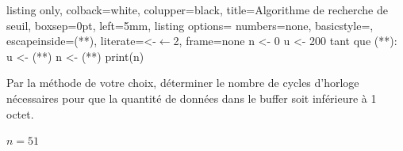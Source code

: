 \begin{enumerate}[series=monDS, resume]
\begin{minipage}{0.45\textwidth}
    \end{minipage}\hfill{}
    \begin{minipage}{0.46\textwidth}
    \begin{tcblisting}{%
  listing only,
  colback=white, 
  colupper=black, 
  title=Algorithme de recherche de seuil,
  boxsep=0pt,
  left=5mm,
  listing options={
    numbers=none,
    basicstyle=\ttfamily,
    escapeinside={(*}{*)},
    literate={<-}{{$\bm{\leftarrow}$}}2, %
    frame=none %
    }
}
n <- 0
u <- 200
tant que (**):
        u <- (**)
        n <- (**)
print(n)
\end{tcblisting}
    \end{minipage}
    \medskip

    \begin{minipage}{0.70\textwidth}
            \item Par la méthode de votre choix, déterminer le nombre de cycles d'horloge nécessaires pour que la quantité de données dans le buffer soit inférieure à 1 octet.
    \end{minipage}\hfill{}
    \begin{minipage}{0.20\textwidth}
\begin{blocvisiblex}[height=1.2]
{\quad}
  $n=51$
    \end{blocvisiblex}
    \end{minipage}
    
\end{enumerate}

\bigskip



